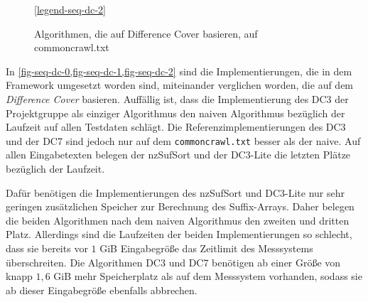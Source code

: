 \begin{figure}[ht]

    \medskip
    \ref{legend-seq-dc-2}
    \caption{Algorithmen, die auf Difference Cover basieren, auf commoncrawl.txt}
    \label{fig-seq-dc-2}
\end{figure}
\FloatBarrier

In  \cref{fig-seq-dc-0,fig-seq-dc-1,fig-seq-dc-2} sind die Implementierungen, die in dem \sacabench Framework umgesetzt worden sind, miteinander verglichen worden, die auf dem \emph{Difference Cover} basieren. Auffällig ist, dass die Implementierung des DC3 der Projektgruppe als einziger Algorithmus den naiven Algorithmus bezüglich der Laufzeit auf allen Testdaten schlägt. Die Referenzimplementierungen des DC3 und der DC7 sind jedoch nur auf dem \texttt{commoncrawl.txt} besser als der naive. Auf allen Eingabetexten belegen der nzSufSort und der DC3-Lite die letzten Plätze bezüglich der Laufzeit.

Dafür benötigen die Implementierungen des nzSufSort und DC3-Lite nur sehr geringen zusätzlichen Speicher zur Berechnung des Suffix-Arrays. Daher belegen die beiden Algorithmen nach dem naiven Algorithmus den zweiten und dritten Platz. Allerdings sind die Laufzeiten der beiden Implementierungen so schlecht, dass sie bereits vor $1$ GiB Eingabegröße das Zeitlimit des Messsystems überschreiten. Die Algorithmen DC3 und DC7 benötigen ab einer Größe von knapp $1,6$ GiB mehr Speicherplatz als auf dem Messsystem vorhanden, sodass sie ab dieser Eingabegröße ebenfalls abbrechen.

